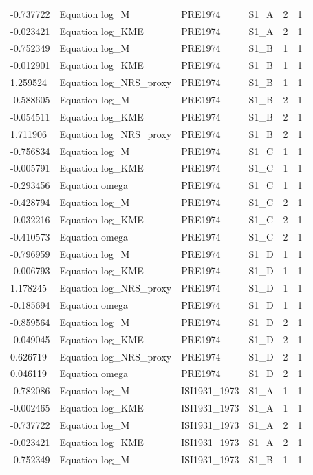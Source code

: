 \begin{tabular}{llllll}
-0.737722 & Equation log\_M & PRE1974 & S1\_A & 2 & 1 \\
-0.023421 & Equation log\_KME & PRE1974 & S1\_A & 2 & 1 \\
-0.752349 & Equation log\_M & PRE1974 & S1\_B & 1 & 1 \\
-0.012901 & Equation log\_KME & PRE1974 & S1\_B & 1 & 1 \\
1.259524 & Equation log\_NRS\_proxy & PRE1974 & S1\_B & 1 & 1 \\
-0.588605 & Equation log\_M & PRE1974 & S1\_B & 2 & 1 \\
-0.054511 & Equation log\_KME & PRE1974 & S1\_B & 2 & 1 \\
1.711906 & Equation log\_NRS\_proxy & PRE1974 & S1\_B & 2 & 1 \\
-0.756834 & Equation log\_M & PRE1974 & S1\_C & 1 & 1 \\
-0.005791 & Equation log\_KME & PRE1974 & S1\_C & 1 & 1 \\
-0.293456 & Equation omega & PRE1974 & S1\_C & 1 & 1 \\
-0.428794 & Equation log\_M & PRE1974 & S1\_C & 2 & 1 \\
-0.032216 & Equation log\_KME & PRE1974 & S1\_C & 2 & 1 \\
-0.410573 & Equation omega & PRE1974 & S1\_C & 2 & 1 \\
-0.796959 & Equation log\_M & PRE1974 & S1\_D & 1 & 1 \\
-0.006793 & Equation log\_KME & PRE1974 & S1\_D & 1 & 1 \\
1.178245 & Equation log\_NRS\_proxy & PRE1974 & S1\_D & 1 & 1 \\
-0.185694 & Equation omega & PRE1974 & S1\_D & 1 & 1 \\
-0.859564 & Equation log\_M & PRE1974 & S1\_D & 2 & 1 \\
-0.049045 & Equation log\_KME & PRE1974 & S1\_D & 2 & 1 \\
0.626719 & Equation log\_NRS\_proxy & PRE1974 & S1\_D & 2 & 1 \\
0.046119 & Equation omega & PRE1974 & S1\_D & 2 & 1 \\
-0.782086 & Equation log\_M & ISI1931\_1973 & S1\_A & 1 & 1 \\
-0.002465 & Equation log\_KME & ISI1931\_1973 & S1\_A & 1 & 1 \\
-0.737722 & Equation log\_M & ISI1931\_1973 & S1\_A & 2 & 1 \\
-0.023421 & Equation log\_KME & ISI1931\_1973 & S1\_A & 2 & 1 \\
-0.752349 & Equation log\_M & ISI1931\_1973 & S1\_B & 1 & 1 \\

\end{tabular}
